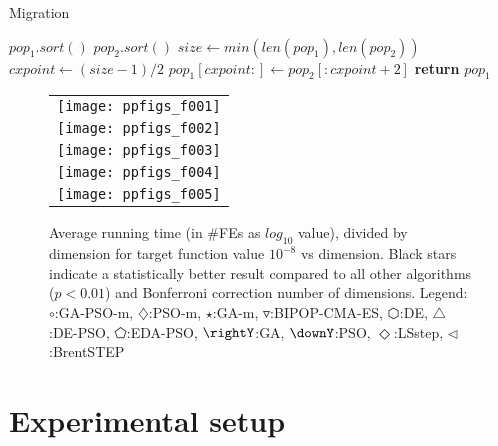 \begin{algorithm}
    \caption{Migration}
    \label{alg:migration}
    \begin{algorithmic}[1]
            \State $pop_1.sort()$
            \State $pop_2.sort()$
            \State $size\gets min(len(pop_1), len(pop_2))$
            \State $cxpoint\gets (size-1)/2$
            \State $pop_1[cxpoint:]\gets pop_2[:cxpoint+2]$
            \State \textbf{return} $pop_1$
        \EndProcedure 
    \end{algorithmic}
\end{algorithm}
%
\begin{figure}
  \begin{tabular}
      {c@{\hspace*{-0.00001\textwidth}}
      }
     
  \texttt{[image: ppfigs\_f001]}\\
  \texttt{[image: ppfigs\_f002]}\\

  \texttt{[image: ppfigs\_f003]}\\
  \texttt{[image: ppfigs\_f004]}\\
  
  \texttt{[image: ppfigs\_f005]}\\
  \end{tabular}
  \vspace{-3ex}
   \caption{Average running time (in \#FEs as $log_{10}$ value),
    divided by dimension for target function value $10^{-8}$ vs dimension. 
    Black stars indicate a statistically better result compared to 
    all other algorithms ($p < 0.01$) and Bonferroni 
    correction number of dimensions. 
    Legend: {\color{NavyBlue}$\circ$}:GA-PSO-m, 
    {\color{Magenta}$\diamondsuit$}:PSO-m, 
    {\color{Orange}$\star$}:GA-m, 
    {\color{CornflowerBlue}$\triangledown$}:BIPOP-CMA-ES,
    {\color{red}$\varhexagon$}:DE, 
    {\color{YellowGreen}$\triangle$}:DE-PSO, 
    {\color{cyan}$\pentagon$}:EDA-PSO, 
    {\color{GreenYellow}$\rightY$}:GA, 
    {\color{ForestGreen}$\downY$}:PSO, 
    {\color{Lavender}$\Diamond$}:LSstep, 
    {\color{SkyBlue}$\triangleleft$}:BrentSTEP
    } 
  \label{fig:avg}
\end{figure}
%
\section{Experimental setup}
\label{setup}

